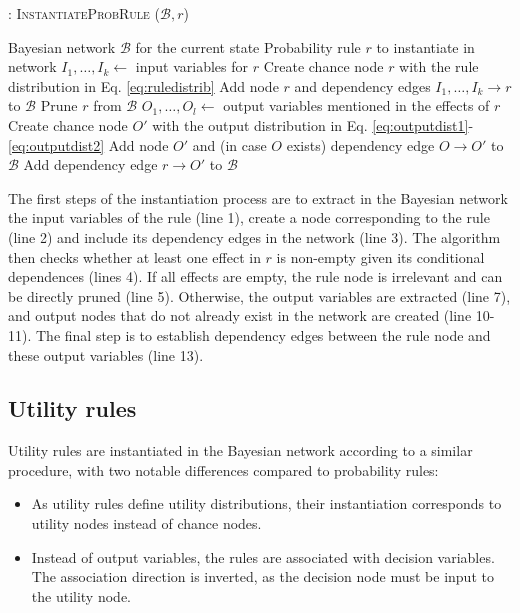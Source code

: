 \begin{algorithm}[h!]
\caption{: \textsc{InstantiateProbRule} ($\mathcal{B}, \mathit{r}$)}
\begin{algorithmic}[1] \vspace{1mm}
\REQUIRE Bayesian network $\mathcal{B}$ for the current state
\REQUIRE Probability rule $\mathit{r}$ to instantiate in network  \vspace{1mm}
\STATE $I_1, \dots, I_k \leftarrow$ input variables for $\mathit{r}$
\STATE Create chance node $r$ with the rule distribution in Eq. \eqref{eq:ruledistrib}
\STATE Add node $r$ and dependency edges $I_1, \dots, I_k \rightarrow r$ to $\mathcal{B}$ 
\STATE Prune $r$ from $\mathcal{B}$
\ELSE
\STATE $O_1, \dots, O_l \leftarrow$ output variables mentioned in the effects of $r$
\STATE Create chance node $O'$ with the output distribution in Eq. \eqref{eq:outputdist1}-\eqref{eq:outputdist2}
\STATE Add node $O'$ and (in case $O$ exists) dependency edge $O \rightarrow O'$ to $\mathcal{B}$
\ENDIF
\STATE Add dependency edge $r \rightarrow O'$ to $\mathcal{B}$ 
\ENDFOR
\ENDIF
\end{algorithmic}
\label{algo:instantiateProbRule}
\end{algorithm}

The first steps of the instantiation process are to extract in the Bayesian network the input variables of the rule (line 1), create a node corresponding to the rule (line 2) and include its dependency edges in the network (line 3).  The algorithm then checks whether at least one effect in $r$ is non-empty given its conditional dependences (lines 4).  If all effects are empty, the rule node is irrelevant and can be directly pruned (line 5). Otherwise, the output variables are extracted (line 7), and output nodes that do not already exist in the network are created (line 10-11). The final step is to establish dependency edges between the rule node and these output variables (line 13).


\subsection{Utility rules}

Utility rules are instantiated in the Bayesian network according to a similar procedure, with two notable differences compared to probability rules: \begin{itemize}
\item As utility rules define utility distributions, their instantiation corresponds to utility nodes instead of chance nodes.
\item Instead of output variables, the rules are associated with decision variables.  The association direction is inverted, as the decision node must be input to the utility node.
\end{itemize} 

